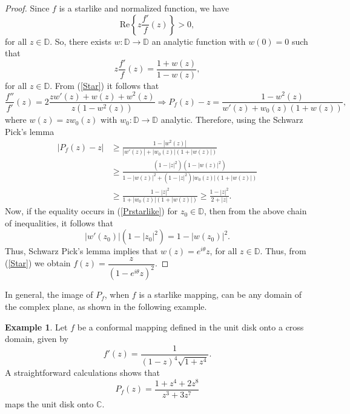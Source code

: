 \documentclass[reqno]{amsart}
\theoremstyle{plain}
\theoremstyle{definition}
\newtheorem{example}[theo]{Example}
\newcommand{\C}{\mathbb{C}}
\newcommand{\D}{\mathbb{D}}
\begin{document}
\begin{proof}
 Since $f$ is a starlike and normalized function, we have
\begin{equation*}
\text{Re} \left\{z\frac{f'}{f}(z)\right\}>0,
\end{equation*}
for all $z\in \D$. So, there exists $w:\D \to \D$ an analytic function with $w(0)=0$ such that 
\begin{equation} \label{Star}
z\frac{f'}{f}(z)=\frac{1+w(z)}{1-w(z)},
\end{equation}
for all $z\in \D$. From (\ref{Star}) it follows that
\begin{equation*}
  \frac{f''}{f'}(z)=2\frac{zw'(z)+w(z)+w^2(z)}{z(1-w^2(z))} \Rightarrow P_f(z)-z=\frac{1-w^2(z)}{w'(z)+w_0(z)(1+w(z))},
\end{equation*}
where $w(z)=zw_0(z)$ with $w_0:\D \to \D$ analytic. Therefore, using the Schwarz Pick's lemma
\begin{align*}
    |P_f(z)-z|&\geq \frac{1-|w^2(z)|}{|w'(z)|+|w_0(z)|(1+|w(z)|)}\\
    &\geq\frac{(1-|z|^2)(1-|w(z)|^2)}{1-|w(z)|^2 +(1-|z|^2)|w_0(z)|(1+|w(z)|)}\\
    &\geq \frac{1-|z|^2}{1+|w_0(z)|(1+|w(z)|)}\geq \frac{1-|z|^2}{2+|z|}.
\end{align*}
Now, if the equality occurs in (\ref{Prstarlike}) for $z_0 \in \D$, then from the above chain of inequalities, it follows that
\[|w'(z_0)|(1-|z_0|^2)=1-|w(z_0)|^2.\]
Thus, Schwarz Pick's lemma implies that $w(z)=e^{i\theta}z$, for all $z\in \D$. Thus, from (\ref{Star}) we obtain $f(z)=\dfrac{z}{(1-e^{i\theta}z)^2}.$ 
\end{proof}

In general, the image of $P_f$, when $f$ is a starlike mapping, can be any domain of the complex plane, as shown in the following example.

\begin{example} Let $f$ be a conformal mapping defined in the unit disk onto a cross domain, given by
\begin{equation*}
  f'(z)=\frac{1}{(1-z)^4\sqrt{1+z^4}}.  
\end{equation*}
 A straightforward calculations shows that 
\begin{equation*}
  P_f(z)=\frac{1+z^4+2z^8}{z^3+3z^7}  
\end{equation*}
maps the unit disk onto $\C$.    
\end{example}
\end{document}
